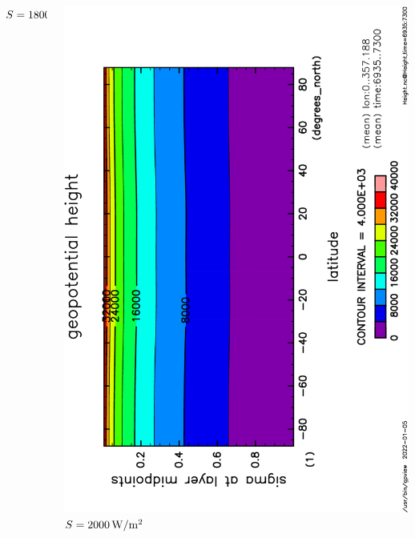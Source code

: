 \documentclass[aspectratio=149,9pt,fleqn]{beamer}
\begin{document}
\begin{frame}
\begin{columns}[T]
\begin{column}{.3\textwidth}
			\(S=1800\hmu{W/m^2}\)
		\end{column}
		\begin{column}{.3\textwidth}
			\centering
			\includegraphics[height=\textwidth,angle=-90]{S2000/Height,time=6935:7300-crop.pdf}
			\(S=2000\hmu{W/m^2}\)
		\end{column}
	\end{columns}
\end{frame}
\end{document}
